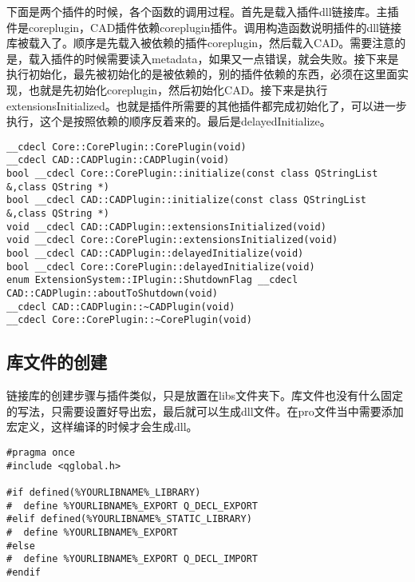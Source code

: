 下面是两个插件的时候，各个函数的调用过程。首先是载入插件dll链接库。主插件是coreplugin，CAD插件依赖coreplugin插件。调用构造函数说明插件的dll链接库被载入了。顺序是先载入被依赖的插件coreplugin，然后载入CAD。需要注意的是，载入插件的时候需要读入metadata，如果又一点错误，就会失败。接下来是执行初始化，最先被初始化的是被依赖的，别的插件依赖的东西，必须在这里面实现，也就是先初始化coreplugin，然后初始化CAD。接下来是执行extensionsInitialized。也就是插件所需要的其他插件都完成初始化了，可以进一步执行，这个是按照依赖的顺序反着来的。最后是delayedInitialize。
\begin{lstlisting}
__cdecl Core::CorePlugin::CorePlugin(void)
__cdecl CAD::CADPlugin::CADPlugin(void)
bool __cdecl Core::CorePlugin::initialize(const class QStringList &,class QString *)
bool __cdecl CAD::CADPlugin::initialize(const class QStringList &,class QString *)
void __cdecl CAD::CADPlugin::extensionsInitialized(void)
void __cdecl Core::CorePlugin::extensionsInitialized(void)
bool __cdecl CAD::CADPlugin::delayedInitialize(void)
bool __cdecl Core::CorePlugin::delayedInitialize(void)    
enum ExtensionSystem::IPlugin::ShutdownFlag __cdecl CAD::CADPlugin::aboutToShutdown(void)
__cdecl CAD::CADPlugin::~CADPlugin(void)
__cdecl Core::CorePlugin::~CorePlugin(void)
\end{lstlisting}
\subsection{库文件的创建}
链接库的创建步骤与插件类似，只是放置在libs文件夹下。库文件也没有什么固定的写法，只需要设置好导出宏，最后就可以生成dll文件。在pro文件当中需要添加宏定义，这样编译的时候才会生成dll。
\begin{lstlisting}
#pragma once
#include <qglobal.h>

#if defined(%YOURLIBNAME%_LIBRARY)
#  define %YOURLIBNAME%_EXPORT Q_DECL_EXPORT
#elif defined(%YOURLIBNAME%_STATIC_LIBRARY)
#  define %YOURLIBNAME%_EXPORT
#else
#  define %YOURLIBNAME%_EXPORT Q_DECL_IMPORT
#endif
\end{lstlisting}